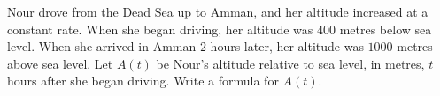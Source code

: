 Nour drove from the Dead Sea up to Amman, and her altitude increased at a constant rate. When she began driving, her altitude was $400$ metres below sea level. When she arrived in Amman $2$ hours later, her altitude was $1000$ metres above sea level. Let $A(t)$ be Nour's altitude relative to sea level, in metres, $t$ hours after she began driving. Write a formula for $A(t)$.
